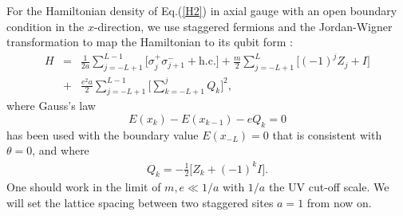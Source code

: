 \documentclass[aps,prd,twocolumn,tightenlines,superscriptaddress,
nofootinbib,preprintnumbers]{revtex4-1}
\newcommand{\Blue}[1]{\textcolor{black}{#1}}
\begin{document}
For the Hamiltonian density of Eq.(\ref{H2}) in axial gauge with an open boundary condition in the $x$-direction, we use staggered fermions and the Jordan-Wigner transformation to map the Hamiltonian to its qubit form \cite{Sala:2018dui,Savage2025}:
\begin{eqnarray}
\label{H}
H 
&=& 
\frac{1}{2a} \sum_{j=-L+1}^{L-1} \Big[ \sigma^+_j \sigma^-_{j+1} + \text{h.c.} \Big]+\frac{m}{2} \sum_{j=-L+1}^{L} \Big[(-1)^j Z_j + I \Big]\nonumber \\
&+& \frac{e^2a}{2} \sum_{j=-L+1}^{L-1} \Big[\sum^j_{k=-L+1}  Q_k \Big]^2 ,
\end{eqnarray}
where Gauss's law 
\begin{equation}
\label{Gauss}
E(x_k)-E(x_{k-1})- e Q_k =0
\end{equation}
has been used with the boundary value $E(x_{-L})=0$ that is consistent with $\theta=0$, and where
\begin{eqnarray}
Q_k = -\frac{1}{2} \Big[Z_k + (-1)^k I \Big].
\end{eqnarray}
One should work in the limit of $m,e \ll 1/a$ with $1/a$ the UV cut-off scale. 
We will set the lattice spacing between two staggered sites $a=1$ from now on. 
\end{document}
